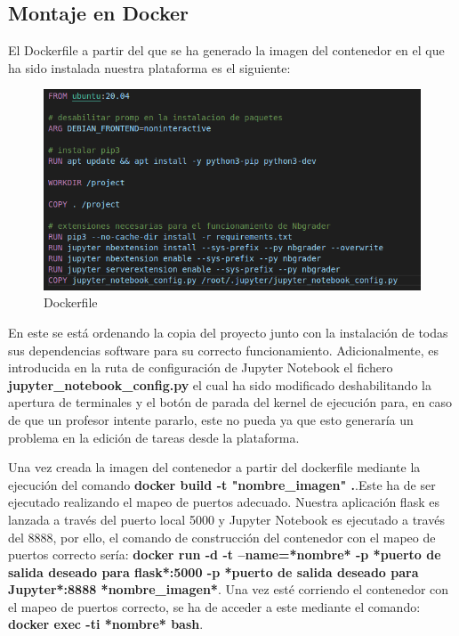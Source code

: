 \subsection{Montaje en Docker}

El Dockerfile a partir del que se ha generado la imagen del contenedor en el que ha sido instalada nuestra plataforma es el siguiente:


\begin{figure}[H]
    \centering
    \includegraphics[scale=0.9]{img/imgs-memoria/Dockerfile.PNG}
    \caption{Dockerfile}
\end{figure}

En este se está ordenando la copia del proyecto junto con la instalación de todas sus dependencias software para su correcto funcionamiento. Adicionalmente, es introducida en la ruta de configuración de Jupyter Notebook el fichero \textbf{jupyter\_notebook\_config.py} el cual ha sido modificado deshabilitando la apertura de terminales y el botón de parada del kernel de ejecución para, en caso de que un profesor intente pararlo, este no pueda ya que esto generaría un problema en la edición de tareas desde la plataforma.

Una vez creada la imagen del contenedor a partir del dockerfile mediante la ejecución del comando \textbf{docker build -t "nombre\_imagen" .}.Este ha de ser ejecutado realizando el mapeo de puertos adecuado. Nuestra aplicación flask es lanzada a través del puerto local 5000 y Jupyter Notebook es ejecutado a través del 8888, por ello, el comando de construcción del contenedor con el mapeo de puertos correcto sería: \textbf{docker run -d -t --name=*nombre* -p *puerto de salida deseado para flask*:5000 -p *puerto de salida deseado para Jupyter*:8888 *nombre\_imagen*}. Una vez esté corriendo el contenedor con el mapeo de puertos correcto, se ha de acceder a este mediante el comando: \textbf{docker exec -ti *nombre* bash}.


